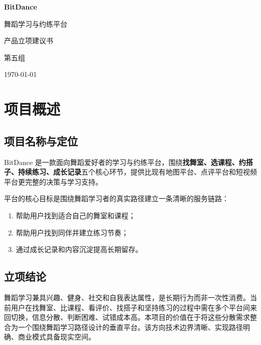 \documentclass[12pt,a4paper]{ctexart}
\begin{document}
\begin{titlepage}
\centering
\vspace*{4cm}
{\Huge\bfseries\color{primary} BitDance\par}
\vspace{0.8cm}
{\LARGE 舞蹈学习与约练平台\par}
\vspace{0.5cm}
{\Large 产品立项建议书\par}
\vspace{3cm}
{\large 第五组\par}
\vspace{2cm}
{\large \today\par}
\vfill
\end{titlepage}

\newpage
\tableofcontents
\newpage

\section{项目概述}

\subsection{项目名称与定位}

BitDance 是一款面向舞蹈爱好者的学习与约练平台，围绕\textbf{找舞室、选课程、约搭子、持续练习、成长记录}五个核心环节，提供比现有地图平台、点评平台和短视频平台更完整的决策与学习支持。

平台的核心目标是围绕舞蹈学习者的真实路径建立一条清晰的服务链路：
\begin{enumerate}
    \item 帮助用户找到适合自己的舞室和课程；
    \item 帮助用户找到同伴并建立练习节奏；
    \item 通过成长记录和内容沉淀提高长期留存。
\end{enumerate}

\subsection{立项结论}

舞蹈学习兼具兴趣、健身、社交和自我表达属性，是长期行为而非一次性消费。当前用户在找舞室、比课程、看评价、找搭子和坚持练习的过程中需在多个平台间来回切换，信息分散、判断困难、试错成本高。本项目的价值在于将这些分散需求整合为一个围绕舞蹈学习路径设计的垂直平台。该方向技术边界清晰、实现路径明确、商业模式具备现实空间。
\end{document}
